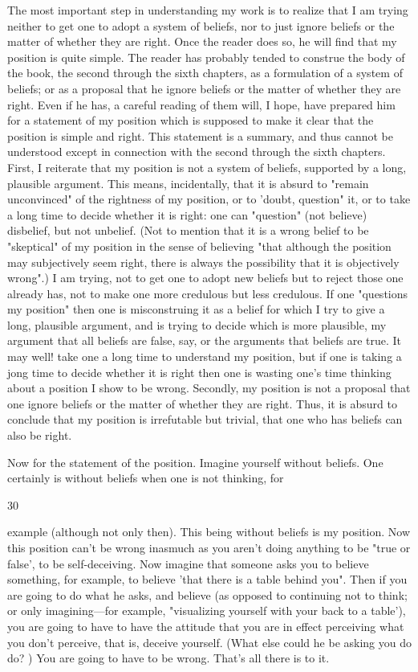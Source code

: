 \documentclass[10pt,twoside]{memoir}
\begin{document}
\begin{enumerate}
{{{{The most important step in understanding my work is to realize that I 
am trying neither to get one to adopt a system of beliefs, nor to just ignore 
beliefs or the matter of whether they are right. Once the reader does so, he 
will find that my position is quite simple. The reader has probably tended to 
construe the body of the book, the second through the sixth chapters, as a 
formulation of a system of beliefs; or as a proposal that he ignore beliefs or 
the matter of whether they are right. Even if he has, a careful reading of 
them will, I hope, have prepared him for a statement of my position which is 
supposed to make it clear that the position is simple and right. This 
statement is a summary, and thus cannot be understood except in 
connection with the second through the sixth chapters. First, I reiterate that 
my position is not a system of beliefs, supported by a long, plausible 
argument. This means, incidentally, that it is absurd to "remain 
unconvinced" of the rightness of my position, or to 'doubt, question" it, or 
to take a long time to decide whether it is right: one can "question" (not 
believe) disbelief, but not unbelief. (Not to mention that it is a wrong belief 
to be "skeptical" of my position in the sense of believing "that although the 
position may subjectively seem right, there is always the possibility that it is 
objectively wrong".) I am trying, not to get one to adopt new beliefs but to 
reject those one already has, not to make one more credulous but less 
credulous. If one "questions my position" then one is misconstruing it as a 
belief for which I try to give a long, plausible argument, and is trying to 
decide which is more plausible, my argument that all beliefs are false, say, or 
the arguments that beliefs are true. It may well! take one a long time to 
understand my position, but if one is taking a jong time to decide whether it 
is right then one is wasting one's time thinking about a position I show to be 
wrong. Secondly, my position is not a proposal that one ignore beliefs or the 
matter of whether they are right. Thus, it is absurd to conclude that my 
position is irrefutable but trivial, that one who has beliefs can also be right. 

Now for the statement of the position. Imagine yourself without 
beliefs. One certainly is without beliefs when one is not thinking, for 


30 


example (although not only then). This being without beliefs is my position. 
Now this position can't be wrong inasmuch as you aren't doing anything to 
be "true or false', to be self-deceiving. Now imagine that someone asks you 
to believe something, for example, to believe 'that there is a table behind 
you". Then if you are going to do what he asks, and believe (as opposed to 
continuing not to think; or only imagining---for example, "visualizing 
yourself with your back to a table'), you are going to have to have the 
attitude that you are in effect perceiving what you don't perceive, that is, 
deceive yourself. (What else could he be asking you do do? ) You are going 
to have to be wrong. That's all there is to it. 

}}}}
\end{enumerate}
\end{document}

